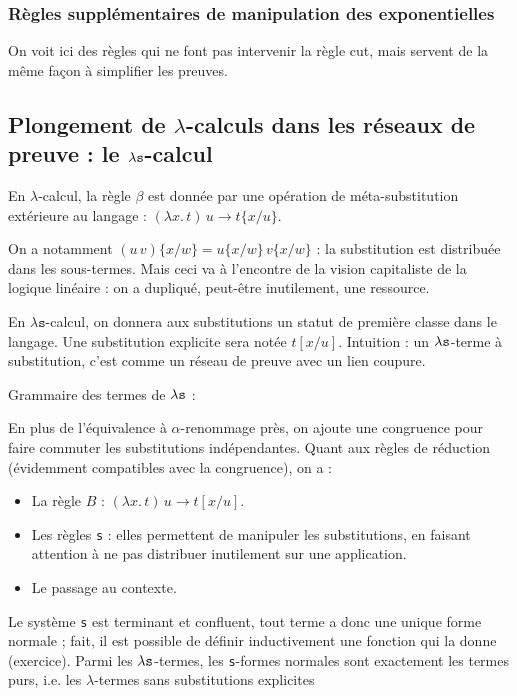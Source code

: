 \documentclass[a4paper, 11pt]{article}
\begin{document}
\subsubsection{Règles supplémentaires de manipulation des exponentielles}

On voit ici des règles qui ne font pas intervenir la règle cut, mais servent de la même façon à simplifier les preuves.

\subsection{Plongement de $\lambda$-calculs dans les réseaux de preuve : le ${\lambda \mathtt{s}}$-calcul}

En $\lambda$-calcul, la règle $\beta$ est donnée par une opération de méta-substitution extérieure au langage : $(\lambda x.\,t)\, u \to t\{x / u \}$.

On a notamment $(u\,v)\{x/w\} = u\{x/w\}\,v\{x/w\}$ : la substitution est distribuée dans les sous-termes. Mais ceci va à l'encontre de la vision capitaliste de la logique linéaire : on a dupliqué, peut-être inutilement, une ressource.

En $\lambda \mathtt{s}$-calcul, on donnera aux substitutions un statut de première classe dans le langage. Une substitution explicite sera notée $t[x/u]$. Intuition : un ${\lambda \mathtt{s}}$-terme à substitution, c'est comme un réseau de preuve avec un lien coupure.

Grammaire des termes de ${\lambda \mathtt{s}}$ :

En plus de l'équivalence à $\alpha$-renommage près, on ajoute une congruence pour faire commuter les substitutions indépendantes. Quant aux règles de réduction (évidemment compatibles avec la congruence), on a :
\begin{itemize}
\item La règle $B$ : $(\lambda x.\,t)\, u \to t[x/u]$.
\item Les règles \texttt{s} : elles permettent de manipuler les substitutions, en faisant attention à ne pas distribuer inutilement sur une application.
\item Le passage au contexte.
\end{itemize}

Le système \texttt{s} est terminant et confluent, tout terme a donc une unique forme normale ; fait, il est possible de définir inductivement une fonction qui la donne (exercice). Parmi les ${\lambda \mathtt{s}}$-termes, les \texttt{s}-formes normales sont exactement les termes purs, i.e. les $\lambda$-termes sans substitutions explicites
\end{document}
